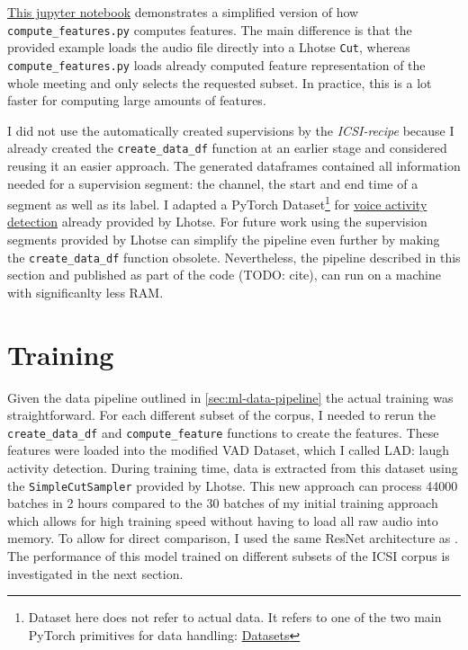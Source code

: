 \documentclass[bsc,frontabs,parskip,deptreport]{infthesis}
\begin{document}
\href{https://github.com/LasseWolter/laughter-detection-icsi/blob/main/Demo.ipynb}{This jupyter notebook} demonstrates a simplified version of how \verb|compute_features.py| computes features. 
The main difference is that the provided example loads the audio file directly into a Lhotse \texttt{Cut}, whereas \verb|compute_features.py| loads already computed feature representation of the whole meeting and only selects the requested subset. In practice, this is a lot faster for computing large amounts of features.

I did not use the automatically created supervisions by the \textit{ICSI-recipe} because I already created the \verb|create_data_df| function at an earlier stage and considered reusing it an easier approach.
The generated dataframes contained all information needed for a supervision segment: the channel, the start and end time of a segment as well as its label. 
I adapted a PyTorch Dataset\footnote{Dataset here does not refer to actual data. It refers to one of the two main PyTorch primitives for data handling: \href{https://PyTorch.org/tutorials/beginner/basics/data_tutorial.html}{Datasets}} for \href{https://lhotse.readthedocs.io/en/latest/datasets.html#lhotse.dataset.vad.VadDataset}{voice activity detection} already provided by Lhotse.
For future work using the supervision segments provided by Lhotse can simplify the pipeline even further by making the \verb|create_data_df| function obsolete. 
Nevertheless, the pipeline described in this section and published as part of the code (TODO: cite), can run on a machine with significanlty less RAM. 


\section{Training}
Given the data pipeline outlined in \autoref{sec:ml-data-pipeline} the actual training was straightforward. For each different subset of the corpus, I needed to rerun the \verb|create_data_df| and \verb|compute_feature| functions to create the features. 
These features were loaded into the modified VAD Dataset, which I called LAD: laugh activity detection.
During training time, data is extracted from this dataset using the \texttt{SimpleCutSampler} provided by Lhotse. 
This new approach can process 44000 batches in 2 hours compared to the 30 batches of my initial training approach which allows for high training speed without having to load all raw audio into memory.
To allow for direct comparison, I used the same ResNet architecture as \citet{gillick2021robust}.
The performance of this model trained on different subsets of the ICSI corpus is investigated in the next section.
\end{document}
